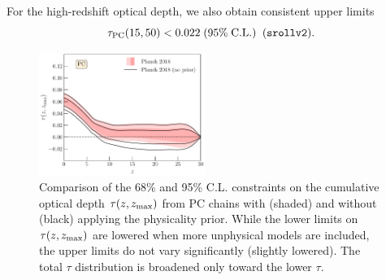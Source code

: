 \documentclass[prd,twocolumn,amsmath,amssymb,floatfix,superscriptaddress,nofootinbib]{revtex4-1}
\newcommand{\zmax}{z_{\rm max}}
\newcommand{\beq}{\begin{equation}}
\newcommand{\eeq}{\end{equation}}
\begin{document}
{For the high-redshift optical depth, we also obtain consistent upper limits
\beq
\tau_{\rm PC}(15, 50) < 0.022 \; (95\%\; \mathrm{C.L.})\;\;(\texttt{srollv2}).
\eeq

\begin{figure}[ht]
\includegraphics[width=0.48\textwidth]{paper/plots/pl18_taugtz_pc_zmax30_pl18_srollv2_with_and_without_physicality_prior_do_rescale_tau_false.pdf}
\caption{Comparison of the 68\% and 95\% C.L. constraints on the cumulative optical depth $\tau(z, \zmax)$ from PC chains with (shaded) and without (black) applying the physicality prior. While the lower limits on $\tau(z, \zmax)$ are lowered when more unphysical models are included, the upper limits do not vary significantly (slightly lowered).  The total $\tau$ distribution is broadened only toward the lower $\tau$. 
}
%
\label{fig:plot_taugtz_2018_with_vs_without_physicality_prior}
\end{figure}


}
\end{document}
